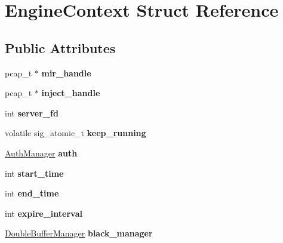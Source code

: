 \hypertarget{structEngineContext}{}\section{Engine\+Context Struct Reference}
\label{structEngineContext}
\subsection*{Public Attributes}
\begin{DoxyCompactItemize}
\item 
\mbox{\label{structEngineContext_a7cdcf407ad62f32abaa2693722c2b518}} 
pcap\+\_\+t $\ast$ {\bfseries mir\+\_\+handle}
\item 
\mbox{\label{structEngineContext_a9ab852f5fe19414acde0b5f86cd6f86d}} 
pcap\+\_\+t $\ast$ {\bfseries inject\+\_\+handle}
\item 
\mbox{\label{structEngineContext_a0fe5e2b6abc648f834c9e2bca4f5dfbb}} 
int {\bfseries server\+\_\+fd}
\item 
\mbox{\label{structEngineContext_a7825e66d81e028e59b5f4f6d0a0bc73b}} 
volatile sig\+\_\+atomic\+\_\+t {\bfseries keep\+\_\+running}
\item 
\mbox{\label{structEngineContext_a9fc3fe7508eaf7a30e77222a1dba02ec}} 
\mbox{\hyperlink{structAuthManager}{Auth\+Manager}} {\bfseries auth}
\item 
\mbox{\label{structEngineContext_a124de4741c4d01f597056e15ba584db1}} 
int {\bfseries start\+\_\+time}
\item 
\mbox{\label{structEngineContext_aa20be6562cfce2fd45f007746cf19069}} 
int {\bfseries end\+\_\+time}
\item 
\mbox{\label{structEngineContext_aa35c80238298d169a55b63a2a3791482}} 
int {\bfseries expire\+\_\+interval}
\item 
\mbox{\label{structEngineContext_a2dbbc037c90bada1d872dea06923c671}} 
\mbox{\hyperlink{structDoubleBufferManager}{Double\+Buffer\+Manager}} {\bfseries black\+\_\+manager}

\end{DoxyCompactItemize}
